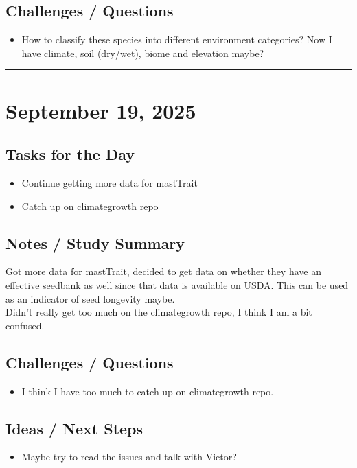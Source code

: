 \documentclass[12pt]{article}
\begin{document}
\subsection*{Challenges / Questions}
\begin{itemize}
    \item How to classify these species into different environment categories? Now I have climate, soil (dry/wet), biome and elevation maybe?
\end{itemize}

\vspace{1em}
\hrule
\vspace{1em}
\section*{September 19, 2025}

\subsection*{Tasks for the Day}
\begin{itemize}
    \item Continue getting more data for mastTrait
    \item Catch up on climategrowth repo
\end{itemize}
\subsection*{Notes / Study Summary}
Got more data for mastTrait, decided to get data on whether they have an effective seedbank as well since that data is available on USDA. This can be used as an indicator of seed longevity maybe.\\
Didn't really get too much on the climategrowth repo, I think I am a bit confused.
\subsection*{Challenges / Questions}
\begin{itemize}
    \item I think I have too much to catch up on climategrowth repo.
\end{itemize}

\subsection*{Ideas / Next Steps}
\begin{itemize}
    \item Maybe try to read the issues and talk with Victor?
\end{itemize}
\end{document}
